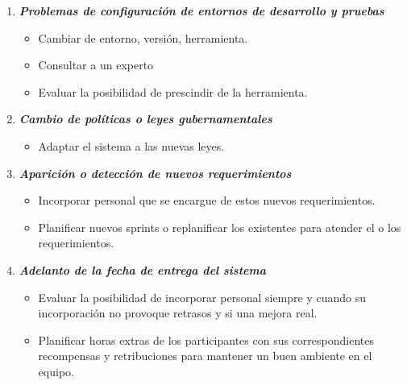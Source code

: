 \begin{enumerate}
        \item \textbf{\textit{Problemas de configuración de entornos de desarrollo y pruebas}}
        	\begin{itemize}
				\item Cambiar de entorno, versión, herramienta.
                \item Consultar a un experto
                \item Evaluar la posibilidad de prescindir de la herramienta.
			\end{itemize}
        \item \textbf{\textit{Cambio de políticas o leyes gubernamentales}}
        	\begin{itemize}
				\item Adaptar el sistema a las nuevas leyes.
			\end{itemize}
        \item \textbf{\textit{Aparición o detección de nuevos requerimientos}}
        	\begin{itemize}
				\item Incorporar personal que se encargue de estos nuevos requerimientos.
                \item Planificar nuevos sprints o replanificar los existentes para atender el o los requerimientos.              
			\end{itemize}
        \item \textbf{\textit{Adelanto de la fecha de entrega del sistema}}
        	\begin{itemize}
				\item Evaluar la posibilidad de incorporar personal siempre y cuando su incorporación no provoque retrasos y si una mejora real.
                \item Planificar horas extras de los participantes con sus correspondientes recompensas y retribuciones para mantener un buen ambiente en el equipo.
			\end{itemize}
	\end{enumerate}
    

